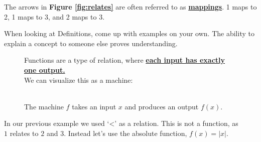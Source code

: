 \noindent
The arrows in \textbf{Figure \ref{fig:relates}} are often referred to as \underline{\textbf{mappings}}. 1 maps to 2, 1 maps to 3, and 2 maps to 3.\\

\begin{Tip}
    When looking at Definitions, come up with examples on your own. The ability to explain a concept to someone else
    proves understanding.\\
\end{Tip}

\newpage


\begin{figure}
    Functions are a type of relation, where \underline{\textbf{each input has exactly one output.}}\\
    We can visualize this as a machine:\\\\


    \hspace{3em}
    \caption{\centering The machine $f$ takes an input $x$ and produces an output $f(x)$.}
    \label{fig:machine}
\end{figure}

\noindent
In our previous example we used `<' as a relation. This is not a function, as\\
$1$ relates to $2$ and $3$. Instead let's use the absolute function, $f(x)=|x|$.

